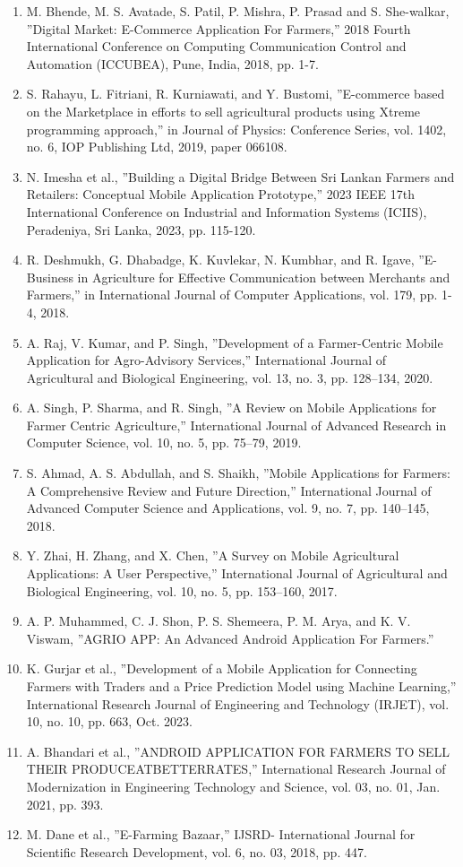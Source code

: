 \documentclass{article}
\begin{document}
\begin{enumerate}
  \renewcommand{\theenumi}{[\arabic{enumi}]}
  \item M. Bhende, M. S. Avatade, S. Patil, P. Mishra, P. Prasad and S. She-walkar, ”Digital Market: E-Commerce Application For Farmers,” 2018 Fourth International Conference on Computing Communication Control and Automation (ICCUBEA), Pune, India, 2018, pp. 1-7.
  \item S. Rahayu, L. Fitriani, R. Kurniawati, and Y. Bustomi, ”E-commerce based on the Marketplace in efforts to sell agricultural products using Xtreme programming approach,” in Journal of Physics: Conference Series, vol. 1402, no. 6, IOP Publishing Ltd, 2019, paper 066108.
  \item N. Imesha et al., ”Building a Digital Bridge Between Sri Lankan Farmers and Retailers: Conceptual Mobile Application Prototype,” 2023 IEEE 17th International Conference on Industrial and Information Systems (ICIIS), Peradeniya, Sri Lanka, 2023, pp. 115-120.
  \item R. Deshmukh, G. Dhabadge, K. Kuvlekar, N. Kumbhar, and R. Igave, ”E-Business in Agriculture for Effective Communication between Merchants and Farmers,” in International Journal of Computer Applications, vol. 179, pp. 1-4, 2018.
  \item A. Raj, V. Kumar, and P. Singh, ”Development of a Farmer-Centric Mobile Application for Agro-Advisory Services,” International Journal of Agricultural and Biological Engineering, vol. 13, no. 3, pp. 128–134, 2020.
  \item A. Singh, P. Sharma, and R. Singh, ”A Review on Mobile Applications for Farmer Centric Agriculture,” International Journal of Advanced Research in Computer Science, vol. 10, no. 5, pp. 75–79, 2019.
  \item S. Ahmad, A. S. Abdullah, and S. Shaikh, ”Mobile Applications for Farmers: A Comprehensive Review and Future Direction,” International Journal of Advanced Computer Science and Applications, vol. 9, no. 7, pp. 140–145, 2018.
  \item Y. Zhai, H. Zhang, and X. Chen, ”A Survey on Mobile Agricultural Applications: A User Perspective,” International Journal of Agricultural and Biological Engineering, vol. 10, no. 5, pp. 153–160, 2017.
  \item A. P. Muhammed, C. J. Shon, P. S. Shemeera, P. M. Arya, and K. V. Viswam, ”AGRIO APP: An Advanced Android Application For Farmers.”
  \item K. Gurjar et al., ”Development of a Mobile Application for Connecting Farmers with Traders and a Price Prediction Model using Machine Learning,” International Research Journal of Engineering and Technology (IRJET), vol. 10, no. 10, pp. 663, Oct. 2023.
  \item A. Bhandari et al., ”ANDROID APPLICATION FOR FARMERS TO SELL THEIR PRODUCEATBETTERRATES,” International Research Journal of Modernization in Engineering Technology and Science, vol. 03, no. 01, Jan. 2021, pp. 393.
  \item M. Dane et al., ”E-Farming Bazaar,” IJSRD- International Journal for Scientific Research Development, vol. 6, no. 03, 2018, pp. 447.
\end{enumerate}
\end{document}
